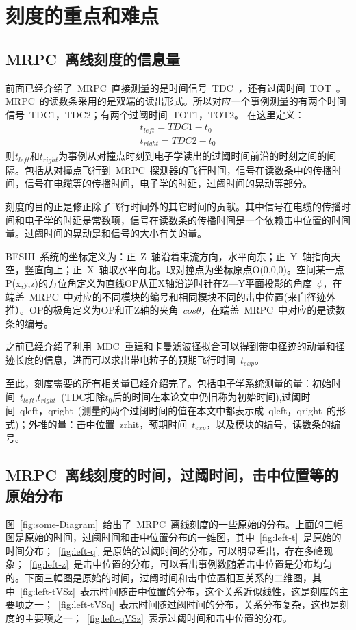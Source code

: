 \section{刻度的重点和难点}
\subsection{MRPC~离线刻度的信息量}
前面已经介绍了~MRPC~直接测量的是时间信号~TDC~，还有过阈时间~TOT~。MRPC~的读数条采用的是双端的读出形式。所以对应一个事例测量的有两个时间信号~TDC1，TDC2；有两个过阈时间~TOT1，TOT2。
在这里定义：
\begin{align}
t_{left}=TDC1-t_{0}
\label{eq:tleft}\\
t_{right}=TDC2-t_{0}
\label{eq:2}
\end{align}
则$t_{left}$和$t_{right}$为事例从对撞点时刻到电子学读出的过阈时间前沿的时刻之间的间隔。包括从对撞点飞行到~MRPC~探测器的飞行时间，信号在读数条中的传播时间，信号在电缆等的传播时间，电子学的时延，过阈时间的晃动等部分。

刻度的目的正是修正除了飞行时间外的其它时间的贡献。其中信号在电缆的传播时间和电子学的时延是常数项，信号在读数条的传播时间是一个依赖击中位置的时间量。过阈时间的晃动是和信号的大小有关的量。

BESIII~系统的坐标定义为：正~Z~轴沿着束流方向，水平向东；正~Y~轴指向天空，竖直向上；正~X~轴取水平向北。取对撞点为坐标原点O(0,0,0)。空间某一点P(x,y,z)的方位角定义为直线OP从正X轴沿逆时针在Z—Y平面投影的角度~$\phi$，在端盖~MRPC~中对应的不同模块的编号和相同模块不同的击中位置(来自径迹外推）。OP的极角定义为OP和正Z轴的夹角~$cos\theta$，在端盖~MRPC~中对应的是读数条的编号。

之前已经介绍了利用~MDC~重建和卡曼滤波径拟合可以得到带电径迹的动量和径迹长度的信息，进而可以求出带电粒子的预期飞行时间~$t_{exp}$。

至此，刻度需要的所有相关量已经介绍完了。包括电子学系统测量的量：初始时间~$t_{left}$,$t_{right}$~(TDC扣除$t_{0}$后的时间在本论文中仍旧称为初始时间),过阈时间~qleft，qright~(测量的两个过阈时间的值在本文中都表示成~qleft，qright~的形式)；外推的量：击中位置~zrhit，预期时间~$t_{exp}$，以及模块的编号，读数条的编号。
\subsection{MRPC~离线刻度的时间，过阈时间，击中位置等的原始分布}
图~\ref{fig:some-Diagram}~给出了~MRPC~离线刻度的一些原始的分布。上面的三幅图是原始的时间，过阈时间和击中位置分布的一维图，其中~\ref{fig:left-t}~是原始的时间分布；~\ref{fig:left-q}~是原始的过阈时间的分布，可以明显看出，存在多峰现象；~\ref{fig:left-z}~是击中位置的分布，可以看出事例数随着击中位置是分布均匀的。下面三幅图是原始的时间，过阈时间和击中位置相互关系的二维图，其中~\ref{fig:left-tVSz}~表示时间随击中位置的分布，这个关系近似线性，这是刻度的主要项之一；~\ref{fig:left-tVSq}~表示时间随过阈时间的分布，关系分布复杂，这也是刻度的主要项之一；~\ref{fig:left-qVSz}~表示过阈时间和击中位置的分布。

